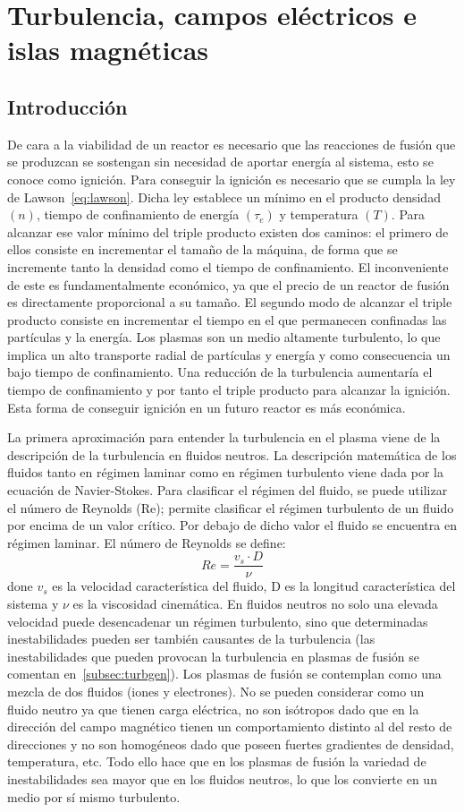 \chapter{Turbulencia, campos eléctricos e islas magnéticas}
\section{Introducción}
De cara a la viabilidad de un reactor es necesario que las reacciones de fusión que se
produzcan se sostengan sin necesidad de aportar energía al sistema, esto se conoce como ignición. 
Para conseguir la ignición es necesario que se cumpla la ley de Lawson~\eqref{eq:lawson}. Dicha
ley establece un mínimo en el producto densidad $(n)$, tiempo de confinamiento
de energía $(\tau_e)$ y temperatura $(T)$.
Para alcanzar ese valor mínimo del triple producto existen dos caminos: el primero de ellos consiste
en incrementar el tamaño de la máquina, de forma que se incremente tanto la densidad como
el tiempo de confinamiento. El inconveniente de este es fundamentalmente económico, ya
que el precio de un reactor de fusión es directamente proporcional a su tamaño. El segundo
modo de alcanzar el triple producto consiste en incrementar el tiempo en el que permanecen
confinadas las partículas y la energía. Los plasmas son un medio altamente turbulento, lo que
implica un alto transporte radial de partículas y energía y como consecuencia un bajo tiempo
de confinamiento. Una reducción de la turbulencia aumentaría el tiempo de confinamiento y
por tanto el triple producto para alcanzar la ignición. Esta forma de conseguir ignición en un
futuro reactor es más económica.\par
La primera aproximación para entender la turbulencia en el plasma viene de la descripción 
de la turbulencia en fluidos neutros. La descripción matemática de los fluidos tanto en
régimen laminar como en régimen turbulento viene dada por la ecuación de Navier-Stokes.
Para clasificar el régimen del fluido, se puede utilizar el número de Reynolds (Re); permite
clasificar el régimen turbulento de un fluido por encima de un valor crítico. Por debajo
de dicho valor el fluido se encuentra en régimen laminar. El número de Reynolds se define:
\begin{equation}\label{eq:reynolds}
    Re=\frac{v_s\cdot D}{\nu}
\end{equation}
done $v_s$ es la velocidad característica del fluido, D es la longitud característica del sistema y
$\nu$ es la viscosidad cinemática. En fluidos neutros no solo una elevada velocidad puede desencadenar
un régimen turbulento, sino que determinadas inestabilidades pueden ser también
causantes de la turbulencia (las inestabilidades que pueden provocan la turbulencia en plasmas de
fusión se comentan en~\ref{subsec:turbgen}).
Los plasmas de fusión se contemplan como una mezcla de dos fluidos (iones y electrones). No
se pueden considerar como un fluido neutro ya que tienen carga eléctrica, no son isótropos
dado que en la dirección del campo magnético tienen un comportamiento distinto al del resto
de direcciones y no son homogéneos dado que poseen fuertes gradientes de densidad, temperatura,
etc. Todo ello hace que en los plasmas de fusión la variedad de inestabilidades sea
mayor que en los fluidos neutros, lo que los convierte en un medio por sí mismo turbulento.
